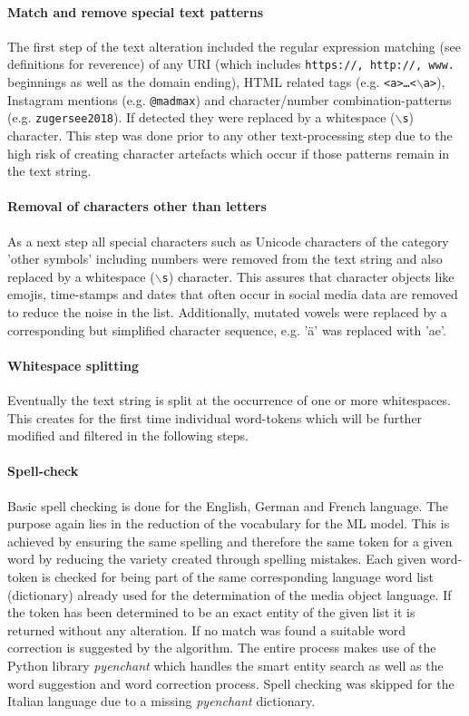 \paragraph*{Match and remove special text patterns} \label{text_patterns}
The first step of the text alteration included the regular expression matching (see definitions for reverence) of any URI (which includes \texttt{https://, http://, www.} beginnings as well as the domain ending), HTML related tags (e.g. \texttt{<a>\dots<$\backslash$a>}), Instagram mentions (e.g. \texttt{@madmax}) and character/number combination-patterns (e.g. \texttt{zugersee2018}). If detected they were replaced by a whitespace (\texttt{$\backslash$s}) character. This step was done prior to any other text-processing step due to the high risk of creating character artefacts which occur if those patterns remain in the text string.

\paragraph*{Removal of characters other than letters} \label{remove_eveything_but_letters}
As a next step all special characters such as Unicode characters of the category 'other symbols' including numbers were removed from the text string and also replaced by a whitespace (\texttt{$\backslash$s}) character. This assures that character objects like emojis, time-stamps and dates that often occur in social media data are removed to reduce the noise in the list. Additionally, mutated vowels were replaced by a corresponding but simplified character sequence, e.g. '\"a' was replaced with 'ae'.

\paragraph*{Whitespace splitting} \label{whitespace_splitting}
Eventually the text string is split at the occurrence of one or more whitespaces. This creates for the first time individual word-tokens which will be further modified and filtered in the following steps.

\paragraph*{Spell-check} \label{spell_check}
Basic spell checking is done for the English, German and French language. The purpose again lies in the reduction of the vocabulary for the ML model. This is achieved by ensuring the same spelling and therefore the same token for a given word by reducing the variety created through spelling mistakes. Each given word-token is checked for being part of the same corresponding language word list (dictionary) already used for the determination of the media object language. If the token has been determined to be an exact entity of the given list it is returned without any alteration. If no match was found a suitable word correction is suggested by the algorithm. The entire process makes use of the Python library \textit{pyenchant} which handles the smart entity search as well as the word suggestion and word correction process. Spell checking was skipped for the Italian language due to a missing \textit{pyenchant} dictionary.

